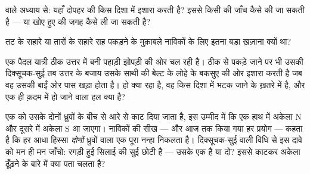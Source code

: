 \begin{exercise}[$\star$]\label{exo:g4:magnets-and-compass:8}
 वाले अध्याय से: यहाँ दोपहर की  किस दिशा में इशारा करती
है? इससे किसी  की जाँच कैसे की जा सकती है --- या खोए हुए
 की जगह कैसे ली जा सकती है?
\end{exercise}

\begin{exercise}[$\star$]\label{exo:g4:magnets-and-compass:9}
तट के सहारे या तारों के सहारे राह पकड़ने के मुक़ाबले 
नाविकों के लिए इतना बड़ा ख़ज़ाना क्यों था?
\end{exercise}

\begin{exercise}[$\star\star$]\label{exo:g4:magnets-and-compass:10}
एक पैदल यात्री ठीक उत्तर में बनी पहाड़ी झोपड़ी की ओर चल रही है। ठीक
से पकड़े जाने पर भी उसकी दिक्सूचक-सुई तब उत्तर के बजाय उसके साथी की
बेल्ट के लोहे के बकसुए की ओर इशारा करती है जब वह उसकी बाईं ओर पास
खड़ा होता है। हो क्या रहा है, वह किस दिशा में भटक जाने के ख़तरे में
है, और एक ही क़दम में हो जाने वाला हल क्या है?
\end{exercise}

\begin{exercise}[$\star\star$]\label{exo:g4:magnets-and-compass:11}
एक  को उसके दोनों ध्रुवों के बीच से आरे से काट दिया जाता है, इस
उम्मीद में कि एक हाथ में अकेला N और दूसरे में अकेला S आ जाएगा।
नाविकों की सीख --- और आज तक किया गया हर प्रयोग --- कहता है कि हर आधा
हिस्सा \emph{दोनों} ध्रुवों वाला एक पूरा नन्हा  निकलता है।
दिक्सूचक-सुई वाली विधि से इस दावे को मन ही मन जाँचो: रगड़ी हुई सिलाई
की सुई छोटी है --- उसके एक  है या दो? इससे काटकर अकेला 
ढूँढ़ने के बारे में क्या पता चलता है?
\end{exercise}
